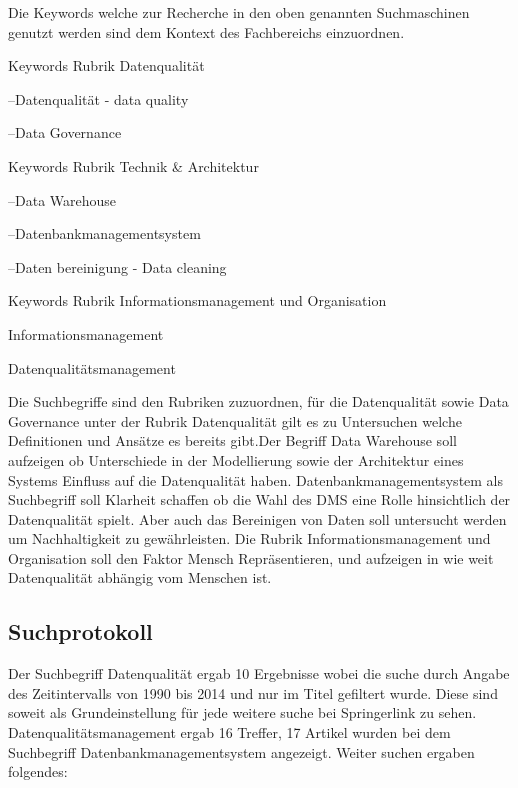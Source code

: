\documentclass[12pt,a4paper,bibliography=totocnumbered,listof=totocnumbered]{scrartcl}
\begin{document}
Die Keywords welche zur Recherche in den oben genannten Suchmaschinen genutzt werden sind dem Kontext des Fachbereichs einzuordnen.

Keywords Rubrik Datenqualität
\begin{compactitem}
	\item --Datenqualität - data quality
	\item --Data Governance 
\end{compactitem}

Keywords Rubrik Technik \& Architektur
\begin{compactitem}
	\item --Data Warehouse 
	\item --Datenbankmanagementsystem 
	\item --Daten bereinigung - Data cleaning
\end{compactitem}

Keywords Rubrik Informationsmanagement und Organisation
\begin{compactitem}
	\item Informationsmanagement 
	\item Datenqualitätsmanagement
\end{compactitem}


Die Suchbegriffe sind den Rubriken zuzuordnen, für die Datenqualität sowie Data Governance unter der Rubrik Datenqualität gilt es zu Untersuchen welche Definitionen und Ansätze es bereits gibt.Der Begriff Data Warehouse soll aufzeigen ob Unterschiede in der Modellierung sowie der Architektur eines Systems Einfluss auf die Datenqualität haben. Datenbankmanagementsystem als Suchbegriff
soll Klarheit schaffen ob die Wahl des DMS eine Rolle hinsichtlich der Datenqualität spielt. Aber auch das Bereinigen von Daten soll untersucht werden um Nachhaltigkeit zu gewährleisten.
Die Rubrik Informationsmanagement und Organisation soll den Faktor Mensch Repräsentieren, und aufzeigen in wie weit Datenqualität abhängig vom Menschen ist.  
\newpage
\subsection{Suchprotokoll}
Der Suchbegriff Datenqualität ergab 10 Ergebnisse wobei die suche durch Angabe des Zeitintervalls von 1990 bis 2014 und nur im Titel gefiltert wurde. Diese sind soweit als Grundeinstellung für jede weitere suche bei Springerlink zu sehen. Datenqualitätsmanagement ergab 16 Treffer, 17 Artikel wurden bei dem Suchbegriff Datenbankmanagementsystem angezeigt. Weiter suchen ergaben folgendes:
\end{document}
